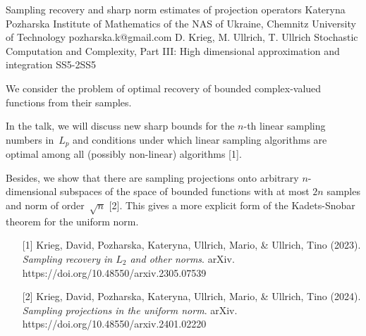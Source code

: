 \begin{talk}
  {Sampling recovery and sharp norm estimates of projection operators}%
  {Kateryna Pozharska}%
  {Institute of Mathematics of the NAS of Ukraine, 
  Chemnitz University of Technology}%
  {pozharska.k@gmail.com}%
  {D. Krieg, M. Ullrich, T. Ullrich}%
{Stochastic Computation and Complexity, Part III: High dimensional approximation and integration}
{}{SS5-2}{SS5}

			

We consider the problem of optimal recovery of bounded complex-valued functions 
from their samples. 

In the talk, we will discuss new sharp bounds for the $n$-th linear sampling numbers in~$L_p$ and conditions under which linear sampling algorithms are optimal among all  (possibly non-linear) algorithms [1].

Besides, we show that there are sampling projections onto arbitrary 
$n$-dimensional subspaces of the space of bounded functions
with at most $2n$ samples and norm of order~$\sqrt{n}$ [2].
This gives a more explicit form of the Kadets-Snobar theorem for the uniform norm.



\medskip


\begin{enumerate}
\item[{[1]}] Krieg, David, Pozharska, Kateryna, Ullrich, Mario, \& Ullrich, Tino (2023). {\it Sampling recovery in $L_2$ and other norms}. arXiv. 
 https://doi.org/10.48550/arxiv.2305.07539
 
 \item[{[2]}] Krieg, David, Pozharska, Kateryna, Ullrich, Mario, \& Ullrich, Tino (2024). {\it Sampling projections in the uniform norm}. arXiv. 
  https://doi.org/10.48550/arxiv.2401.02220
 
\end{enumerate}


\end{talk}

